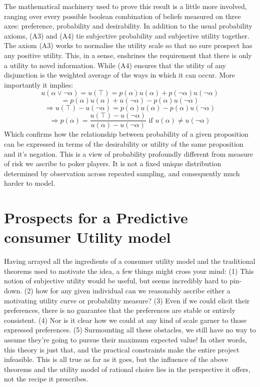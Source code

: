 \documentclass{tufte-handout}
\begin{document}
The mathematical machinery used to prove this result is a little more involved, ranging over every possible boolean combination of beliefs measured on three axes: preference, probability and desirability. In addition to the usual probability axioms, (A3) and (A4) tie subjective probability and subjective utility together. The axiom (A3) works to normalise the utility scale so that no sure prospect has any positive utility. This, in a sense, enshrines the requirement that there is only a utility to novel information. While (A4) ensures that the utility of any disjunction is the weighted average of the ways in which it can occur. More importantly it implies:
 $$u(\alpha \vee \neg\alpha) = u(\top) = p(\alpha)u(\alpha) + p(\neg\alpha)u(\neg\alpha)$$  
 $$= p(\alpha)u(\alpha) + u(\neg\alpha) - p(\alpha)u(\neg\alpha) $$
 $$ \Rightarrow u(\top) - u(\neg\alpha) = p(\alpha)u(\alpha)  - p(\alpha)u(\neg\alpha)$$
 $$ \Rightarrow p(\alpha) = \frac{u(\top) - u(\neg\alpha)}{ u(\alpha)  - u(\neg\alpha)} \text{  if } u(\alpha) \neq u(\neg\alpha) $$ 
Which confirms how the relationship between probability of a given proposition can be expressed in terms of the desirability or utility of the same proposition and it's negation. This is a view of probability profoundly different from measure of risk we ascribe to poker players. It is not a fixed unique distribution determined by observation across repeated sampling, and consequently much harder to model.

\section{\textbf{Prospects for a Predictive consumer Utility model}}
\label{sec:Segmentation}
Having arrayed all the ingredients of a consumer utility model and the traditional theorems used to motivate the idea, a few things might cross your mind: (1) This notion of subjective utility would be useful, but seems incredibly hard to pin-down. (2) how for any given individual can we reasonably ascribe either a motivating utility curve or probability measure? (3) Even if we could elicit their preferences, there is no guarantee that the preferences are stable or entirely consistent. (4) Nor is it clear how we could at any kind of scale garner to those expressed preferences. (5) Surmounting all these obstacles, we still have no way to assume they're going to pursue their maximum expected value! In other words, this theory is just that, and the practical constraints make the entire project infeasible. This is all true as far as it goes, but the influence of the above theorems and the utility model of rational choice lies in the perspective it offers, not the recipe it prescribes.
\linebreak
\end{document}
